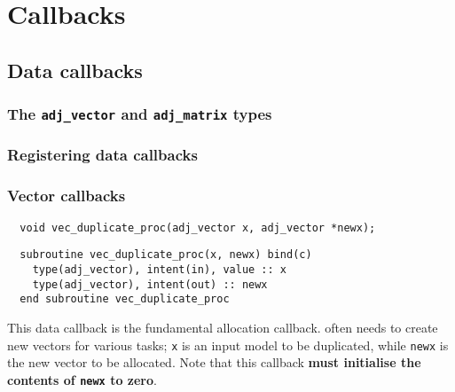 \chapter{Callbacks} \label{chap:callbacks}

\begin{synopsis}
\end{synopsis}
\minitoc
\vspace{\fill}
\newpage

\section{Data callbacks}
\subsection{The \texttt{adj_vector} and \texttt{adj_matrix} types}
\subsection{Registering data callbacks}
\subsection{Vector callbacks}
\begin{framed}
\vspace{-0.7cm}
\begin{verbatim}
  void vec_duplicate_proc(adj_vector x, adj_vector *newx);
\end{verbatim}
\vspace{-1.0cm}
\begin{verbatim}
  subroutine vec_duplicate_proc(x, newx) bind(c)
    type(adj_vector), intent(in), value :: x
    type(adj_vector), intent(out) :: newx
  end subroutine vec_duplicate_proc
\end{verbatim}
\vspace{-0.5cm}
\end{framed}
This data callback is the fundamental allocation callback. \libadjoint
often needs to create new vectors for various tasks; \texttt{x} is an
input model  to be duplicated, while \texttt{newx} is the new vector
to be allocated. Note that this callback \textbf{must initialise the contents of \texttt{newx} to zero}.

